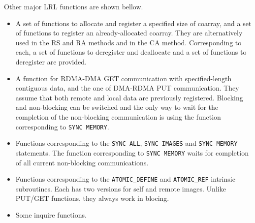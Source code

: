 Other major LRL functions are shown bellow.
\begin{itemize}
\item
A set of functions to allocate and register a specified size of coarray,
and a set of functions to register an already-allocated coarray.
They are alternatively used in the RS and RA methods and in the CA method.
Corresponding to each, a set of functions to deregister and deallocate and
a set of functions to deregister are provided.

\item
A function for RDMA-DMA GET communication with specified-length contiguous
data, and the one of DMA-RDMA PUT communication.
They assume that both remote and local data are previously registered.
Blocking and non-blocking can be switched and the only way to wait for
the completion of the non-blocking communication is using the function
corresponding to {\tt SYNC MEMORY}.

\item
Functions corresponding to the {\tt SYNC ALL}, {\tt SYNC IMAGES} and 
{\tt SYNC MEMORY} statements. 
The function corresponding to {\tt SYNC MEMORY} waits for completion of all 
current non-blocking communications.

\item
Functions corresponding to the {\tt ATOMIC\_DEFINE} and {\tt ATOMIC\_REF} 
intrinsic subroutines. Each has two versions for self and remote images.
Unlike PUT/GET functions, they always work in blocing.

\item
Some inquire functions.
\end{itemize}

